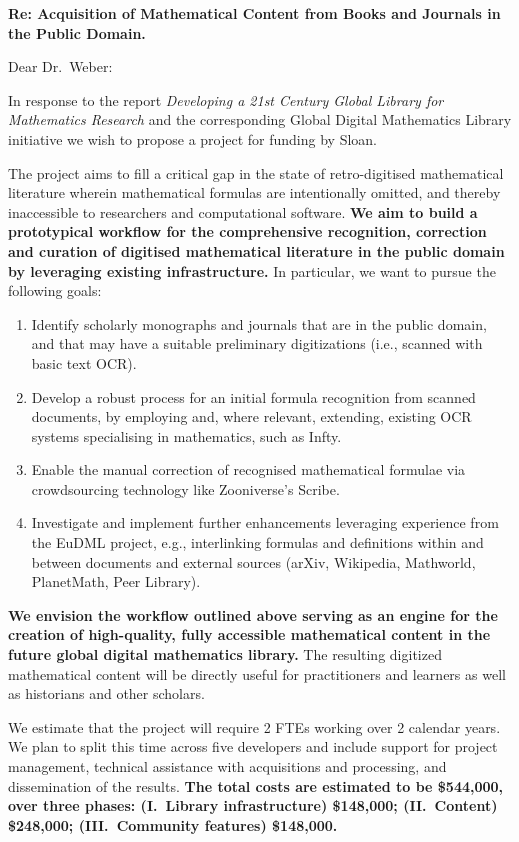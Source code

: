 \documentclass[10pt]{article}
\begin{document}
\thispagestyle{empty}

\noindent\textbf{Re: \quad Acquisition of Mathematical Content from Books and Journals in the Public Domain.}

\bigskip

\noindent Dear Dr.~Weber:

\bigskip

In response to the report \emph{Developing a 21st Century Global Library
for Mathematics Research} and the corresponding Global Digital
Mathematics Library initiative we wish to propose a project 
for funding by Sloan.

The project aims to fill a critical gap
in the state of retro-digitised mathematical literature
wherein mathematical formulas are intentionally omitted, 
and thereby inaccessible to researchers and computational software.
\textbf{We aim to build a prototypical workflow for the comprehensive 
recognition, correction
and curation of digitised mathematical literature in the public domain 
by leveraging existing infrastructure.} In particular, we want to pursue 
the following goals:
\begin{enumerate}
\item Identify scholarly monographs and journals that are in the
  public domain, and that may have a suitable preliminary
  digitizations (i.e., scanned with basic text OCR).
\item Develop a robust process for an initial formula recognition from scanned 
documents, by employing and, where relevant, extending, existing OCR systems 
specialising in mathematics, such as {\sf Infty}.
\item Enable 
the manual correction of recognised mathematical formulae via crowdsourcing 
technology like Zooniverse's {\sf Scribe}.
\item Investigate and implement further enhancements leveraging
experience from the EuDML project, e.g., 
interlinking formulas and definitions within and between documents and
external sources  (arXiv, Wikipedia, Mathworld, PlanetMath, Peer 
Library).
\end{enumerate}
\textbf{We envision the workflow outlined above serving as an engine
  for the creation of high-quality, fully accessible mathematical
  content in the future global digital mathematics library.}  The
resulting digitized mathematical content will be directly useful for
practitioners and learners as well as historians and other scholars.

We estimate that the project will require 2 FTEs working
over 2 calendar years.  We plan to split this time across
five developers and include support for project management, technical
assistance with acquisitions and processing, and dissemination of the
results.  \textbf{The total costs are estimated to be \$544,000, over
  three phases: (I.~Library infrastructure) \$148,000; (II.~Content)
  \$248,000; (III.~Community features) \$148,000.}
\end{document}
